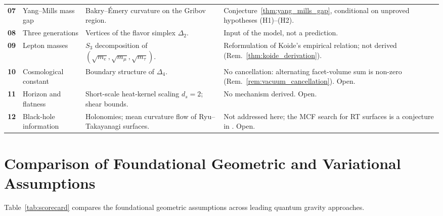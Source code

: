 \documentclass[11pt,a4paper,reqno]{amsart}
\theoremstyle{definition}
\numberwithin{equation}{section}
\begin{document}
\begin{table}[htbp]
\begin{tabularx}{\textwidth}{@{} c >{\raggedright\arraybackslash}p{2.5cm} >{\raggedright\arraybackslash}X >{\raggedright\arraybackslash}X @{}}
\textbf{07} & Yang--Mills mass gap & Bakry--\'Emery curvature on the Gribov region. & Conjecture~\ref{thm:yang_mills_gap}, conditional on unproved hypotheses (H1)--(H2). \\
\textbf{08} & Three generations & Vertices of the flavor simplex $\Delta_2$. & Input of the model, not a prediction. \\
\textbf{09} & Lepton masses & $S_3$ decomposition of $(\sqrt{m_e}, \sqrt{m_\mu}, \sqrt{m_\tau})$. & Reformulation of Koide's empirical relation; not derived (Rem.~\ref{thm:koide_derivation}). \\
\textbf{10} & Cosmological constant & Boundary structure of $\Delta_4$. & No cancellation: alternating facet-volume sum is non-zero (Rem.~\ref{rem:vacuum_cancellation}). Open. \\
\textbf{11} & Horizon and flatness & Short-scale heat-kernel scaling $d_s = 2$; shear bounds. & No mechanism derived. Open. \\
\textbf{12} & Black-hole information & Holonomies; mean curvature flow of Ryu--Takayanagi surfaces. & Not addressed here; the MCF search for RT surfaces is a conjecture in \cite{silvafilho2026treatise}. Open. \\
\bottomrule
\end{tabularx}
\end{table}

\section{Comparison of Foundational Geometric and Variational Assumptions}
\label{sec:comparative_scorecard}

Table~\ref{tab:scorecard} compares the foundational geometric assumptions across leading quantum gravity approaches.
\end{document}
